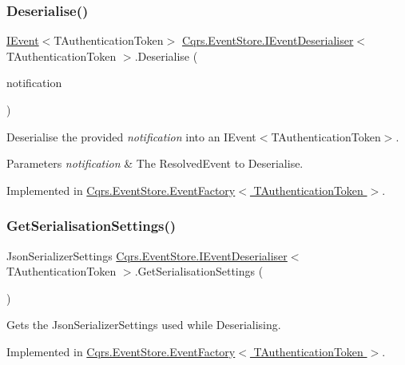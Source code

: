 \subsubsection{\texorpdfstring{Deserialise()}{Deserialise()}\hspace{0.1cm}{\footnotesize\ttfamily [2/2]}}
{\footnotesize\ttfamily \hyperlink{interfaceCqrs_1_1Events_1_1IEvent}{I\+Event}$<$T\+Authentication\+Token$>$ \hyperlink{interfaceCqrs_1_1EventStore_1_1IEventDeserialiser}{Cqrs.\+Event\+Store.\+I\+Event\+Deserialiser}$<$ T\+Authentication\+Token $>$.Deserialise (\begin{DoxyParamCaption}\item[{Resolved\+Event}]{notification }\end{DoxyParamCaption})}



Deserialise the provided {\itshape notification}  into an I\+Event$<$\+T\+Authentication\+Token$>$. 


\begin{DoxyParams}{Parameters}
{\em notification} & The Resolved\+Event to Deserialise.\\
\hline
\end{DoxyParams}


Implemented in \hyperlink{classCqrs_1_1EventStore_1_1EventFactory_a1be7f3c4014991bc4b9619eaa2e8b9a4_a1be7f3c4014991bc4b9619eaa2e8b9a4}{Cqrs.\+Event\+Store.\+Event\+Factory$<$ T\+Authentication\+Token $>$}.

\mbox{\label{interfaceCqrs_1_1EventStore_1_1IEventDeserialiser_aa2859d10fd556b743679079ac15ffdde_aa2859d10fd556b743679079ac15ffdde}} 
\subsubsection{\texorpdfstring{Get\+Serialisation\+Settings()}{GetSerialisationSettings()}}
{\footnotesize\ttfamily Json\+Serializer\+Settings \hyperlink{interfaceCqrs_1_1EventStore_1_1IEventDeserialiser}{Cqrs.\+Event\+Store.\+I\+Event\+Deserialiser}$<$ T\+Authentication\+Token $>$.Get\+Serialisation\+Settings (\begin{DoxyParamCaption}{ }\end{DoxyParamCaption})}



Gets the Json\+Serializer\+Settings used while Deserialising. 



Implemented in \hyperlink{classCqrs_1_1EventStore_1_1EventFactory_a4e52c4fd639d1af97b1ecc5052189783_a4e52c4fd639d1af97b1ecc5052189783}{Cqrs.\+Event\+Store.\+Event\+Factory$<$ T\+Authentication\+Token $>$}.

